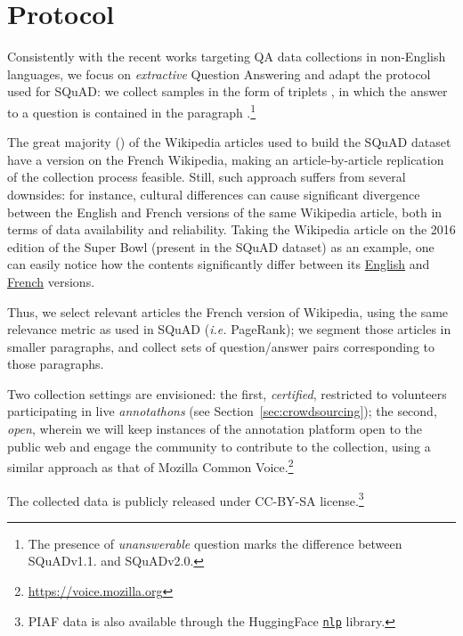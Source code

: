 \documentclass[10pt, a4paper]{article}
\begin{document}
\section{Protocol}
\label{sec:Protocol}

Consistently with the recent works targeting QA data collections in non-English languages, we focus on \emph{extractive} Question Answering and adapt the protocol used for SQuAD: we collect samples in the form of triplets \emph{}, in which the answer  to a question  is contained in the paragraph .\footnote{The presence of \emph{unanswerable} question marks the difference between SQuADv1.1. and SQuADv2.0.}

The great majority () of the Wikipedia articles used to build the SQuAD dataset have a version on the French Wikipedia, making an article-by-article replication of the collection process feasible. Still, such approach suffers from several downsides: for instance, cultural differences can cause significant divergence between the English and French versions of the same Wikipedia article, both in terms of data availability and reliability. Taking the Wikipedia article on the 2016 edition of the Super Bowl (present in the SQuAD dataset) as an example, one can easily notice how the contents significantly differ between its \href{https://en.wikipedia.org/wiki/Super_Bowl_50}{English} and \href{https://en.wikipedia.org/wiki/Super_Bowl_50}{French} versions.

Thus, we select relevant articles the French version of Wikipedia, using the same relevance metric as used in SQuAD (\emph{i.e.} PageRank); we segment those articles in smaller paragraphs, and collect sets of question/answer pairs corresponding to those paragraphs.

Two collection settings are envisioned: the first, \emph{certified}, restricted to volunteers participating in live \emph{annotathons} (see Section~\ref{sec:crowdsourcing}); the second, \emph{open}, wherein we will keep instances of the annotation platform open to the public web and engage the community to contribute to the collection, using a similar approach as that of Mozilla Common Voice.\footnote{\url{https://voice.mozilla.org}}


The collected data is publicly released under CC-BY-SA license.\footnote{PIAF data is also available through the HuggingFace \href{https://github.com/huggingface/nlp}{\texttt{nlp}} library.}
\end{document}
